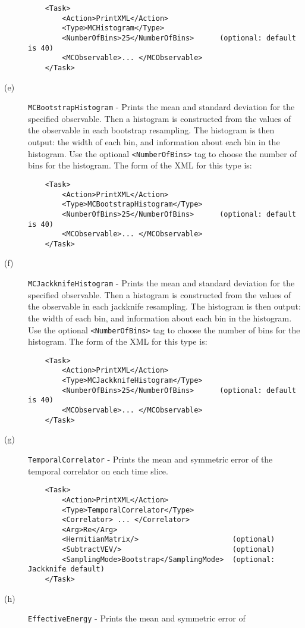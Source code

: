 \documentclass[12pt,notitlepage,letterpaper]{article}
\newcommand{\vb}{\texttt}
\begin{document}
\begin{description}
\begin{verbatim}
    <Task>
        <Action>PrintXML</Action>
        <Type>MCHistogram</Type>
        <NumberOfBins>25</NumberOfBins>      (optional: default is 40)
        <MCObservable>... </MCObservable>
    </Task>
\end{verbatim}
\item[(e)] \vb{MCBootstrapHistogram} - Prints the mean and standard
  deviation for the specified observable.
  Then a histogram is constructed from the values of the observable in each bootstrap resampling.
  The histogram is then output: the width of each bin, and information about each bin in the histogram.
  Use the optional \vb{<NumberOfBins>} tag to choose the number of bins for the histogram.
  The form of the XML for this type is:
\begin{verbatim}
    <Task>
        <Action>PrintXML</Action>
        <Type>MCBootstrapHistogram</Type>
        <NumberOfBins>25</NumberOfBins>      (optional: default is 40)
        <MCObservable>... </MCObservable>
    </Task>
\end{verbatim}
\item[(f)] \vb{MCJackknifeHistogram} - Prints the mean and standard
  deviation for the specified observable.
  Then a histogram is constructed from the values of the observable in each jackknife resampling.
  The histogram is then output: the width of each bin, and information about each bin in the histogram.
  Use the optional \vb{<NumberOfBins>} tag to choose the number of bins for the histogram.
  The form of the XML for this type is:
\begin{verbatim}
    <Task>
        <Action>PrintXML</Action>
        <Type>MCJackknifeHistogram</Type>
        <NumberOfBins>25</NumberOfBins>      (optional: default is 40)
        <MCObservable>... </MCObservable>
    </Task>
\end{verbatim}
\item[(g)] \vb{TemporalCorrelator} - Prints the mean and symmetric error
of the temporal correlator on each time slice.
\begin{verbatim}
    <Task>
        <Action>PrintXML</Action>
        <Type>TemporalCorrelator</Type>
        <Correlator> ... </Correlator>
        <Arg>Re</Arg>
        <HermitianMatrix/>                      (optional)
        <SubtractVEV/>                          (optional)
        <SamplingMode>Bootstrap</SamplingMode>  (optional: Jackknife default)
    </Task>
\end{verbatim}
\item[(h)] \vb{EffectiveEnergy} - Prints the mean and symmetric error of

\end{description}
\end{document}

